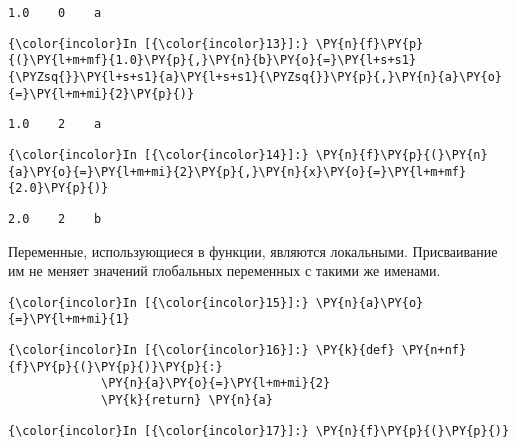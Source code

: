    \begin{Verbatim}[commandchars=\\\{\}]
1.0    0    a

    \end{Verbatim}

    \begin{Verbatim}[commandchars=\\\{\}]
{\color{incolor}In [{\color{incolor}13}]:} \PY{n}{f}\PY{p}{(}\PY{l+m+mf}{1.0}\PY{p}{,}\PY{n}{b}\PY{o}{=}\PY{l+s+s1}{\PYZsq{}}\PY{l+s+s1}{a}\PY{l+s+s1}{\PYZsq{}}\PY{p}{,}\PY{n}{a}\PY{o}{=}\PY{l+m+mi}{2}\PY{p}{)}
\end{Verbatim}

    \begin{Verbatim}[commandchars=\\\{\}]
1.0    2    a

    \end{Verbatim}

    \begin{Verbatim}[commandchars=\\\{\}]
{\color{incolor}In [{\color{incolor}14}]:} \PY{n}{f}\PY{p}{(}\PY{n}{a}\PY{o}{=}\PY{l+m+mi}{2}\PY{p}{,}\PY{n}{x}\PY{o}{=}\PY{l+m+mf}{2.0}\PY{p}{)}
\end{Verbatim}

    \begin{Verbatim}[commandchars=\\\{\}]
2.0    2    b

    \end{Verbatim}

    Переменные, использующиеся в функции, являются локальными. Присваивание
им не меняет значений глобальных переменных с такими же именами.

    \begin{Verbatim}[commandchars=\\\{\}]
{\color{incolor}In [{\color{incolor}15}]:} \PY{n}{a}\PY{o}{=}\PY{l+m+mi}{1}
\end{Verbatim}

    \begin{Verbatim}[commandchars=\\\{\}]
{\color{incolor}In [{\color{incolor}16}]:} \PY{k}{def} \PY{n+nf}{f}\PY{p}{(}\PY{p}{)}\PY{p}{:}
             \PY{n}{a}\PY{o}{=}\PY{l+m+mi}{2}
             \PY{k}{return} \PY{n}{a}
\end{Verbatim}

    \begin{Verbatim}[commandchars=\\\{\}]
{\color{incolor}In [{\color{incolor}17}]:} \PY{n}{f}\PY{p}{(}\PY{p}{)}
\end{Verbatim}

